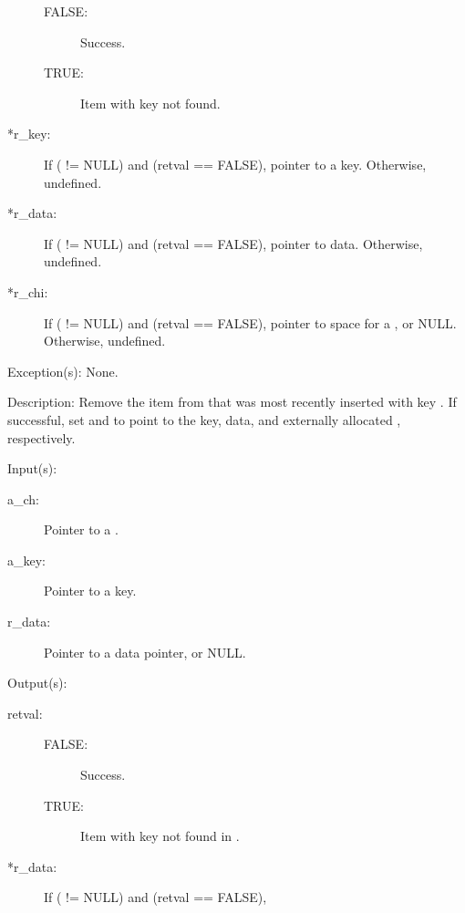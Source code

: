 \begin{capi}
\begin{capilist}
\begin{description}
\begin{description}
			\item[FALSE: ]
				Success.
			\item[TRUE: ]
				Item with key  not	found.
			\end{description}
		\item[*r\_key: ]
			If ( != NULL) and (retval == FALSE),
			pointer to a key.  Otherwise, undefined.
		\item[*r\_data: ]
			If ( != NULL) and (retval == FALSE),
			pointer to data.  Otherwise, undefined.
		\item[*r\_chi: ]
			If ( != NULL) and (retval == FALSE),
			pointer to space for a , or NULL.
			Otherwise, undefined.
		\end{description}
	\item[Exception(s): ] None.
	\item[Description: ]
		Remove the item from  that was most recently
		inserted with key .  If successful, set
		 and  to point to the key, data,
		and externally allocated , respectively.
	\end{capilist}
\label{ch_search}
	\begin{capilist}
	\item[Input(s): ]
		\begin{description}\item[]
		\item[a\_ch: ]
			Pointer to a .
		\item[a\_key: ]
			Pointer to a key.
		\item[r\_data: ]
			Pointer to a data pointer, or NULL.
		\end{description}
	\item[Output(s): ]
		\begin{description}\item[]
		\item[retval: ]
			\begin{description}\item[]
			\item[FALSE: ]
				Success.
			\item[TRUE: ]
				Item with key  not found in
				.
			\end{description}
		\item[*r\_data: ]
			If ( != NULL) and (retval == FALSE),

\end{description}
\end{capilist}
\end{capi}
